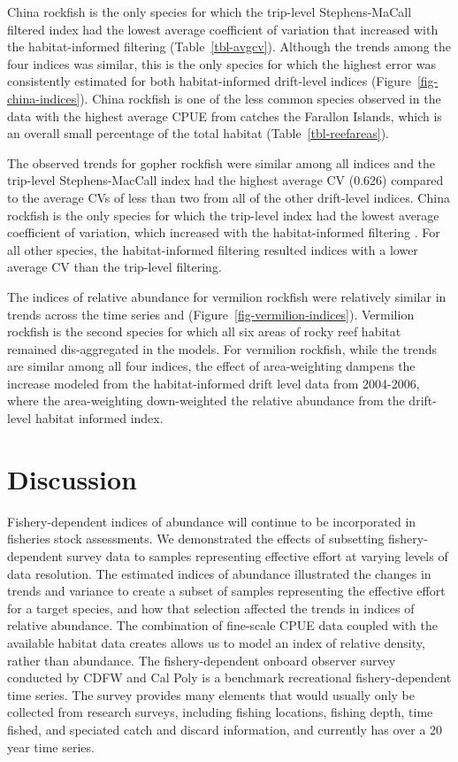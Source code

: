 \documentclass[
  12pt,
  authoryear,
  preprint,
  3p]{elsarticle}
\begin{document}
China rockfish is the only species for which the trip-level
Stephens-MaCall filtered index had the lowest average coefficient of
variation that increased with the habitat-informed filtering
(Table~\ref{tbl-avgcv}). Although the trends among the four indices was
similar, this is the only species for which the highest error was
consistently estimated for both habitat-informed drift-level indices
(Figure~\ref{fig-china-indices}). China rockfish is one of the less
common species observed in the data with the highest average CPUE from
catches the Farallon Islands, which is an overall small percentage of
the total habitat (Table~\ref{tbl-reefareas}).

The observed trends for gopher rockfish were similar among all indices
and the trip-level Stephens-MacCall index had the highest average CV
(0.626) compared to the average CVs of less than two from all of the
other drift-level indices. China rockfish is the only species for which
the trip-level index had the lowest average coefficient of variation,
which increased with the habitat-informed filtering . For all other
species, the habitat-informed filtering resulted indices with a lower
average CV than the trip-level filtering.

The indices of relative abundance for vermilion rockfish were relatively
similar in trends across the time series and
(Figure~\ref{fig-vermilion-indices}). Vermilion rockfish is the second
species for which all six areas of rocky reef habitat remained
dis-aggregated in the models. For vermilion rockfish, while the trends
are similar among all four indices, the effect of area-weighting dampens
the increase modeled from the habitat-informed drift level data from
2004-2006, where the area-weighting down-weighted the relative abundance
from the drift-level habitat informed index.

\FloatBarrier

\hypertarget{discussion}{%
\section{Discussion}\label{discussion}}

Fishery-dependent indices of abundance will continue to be incorporated
in fisheries stock assessments. We demonstrated the effects of
subsetting fishery-dependent survey data to samples representing
effective effort at varying levels of data resolution. The estimated
indices of abundance illustrated the changes in trends and variance to
create a subset of samples representing the effective effort for a
target species, and how that selection affected the trends in indices of
relative abundance. The combination of fine-scale CPUE data coupled with
the available habitat data creates allows us to model an index of
relative density, rather than abundance. The fishery-dependent onboard
observer survey conducted by CDFW and Cal Poly is a benchmark
recreational fishery-dependent time series. The survey provides many
elements that would usually only be collected from research surveys,
including fishing locations, fishing depth, time fished, and speciated
catch and discard information, and currently has over a 20 year time
series.
\end{document}
